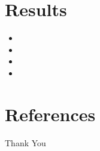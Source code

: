 \documentclass{beamer}
\begin{document}
\section{Results}
\begin{frame}
    \begin{itemize}
        \item \lipsum[4][1-4]
        \item \lipsum[4][5-9]
        \item \lipsum[5][1-4]
        \item \lipsum[5][5-8]
    \end{itemize}
\end{frame}

\section{References}

\begin{frame}[allowframebreaks]
    
    
    \nocite{*} %
\end{frame}


\begin{frame}
    \begin{center}
        {\Huge\calligra Thank You}
    \end{center}
\end{frame}
\end{document}
